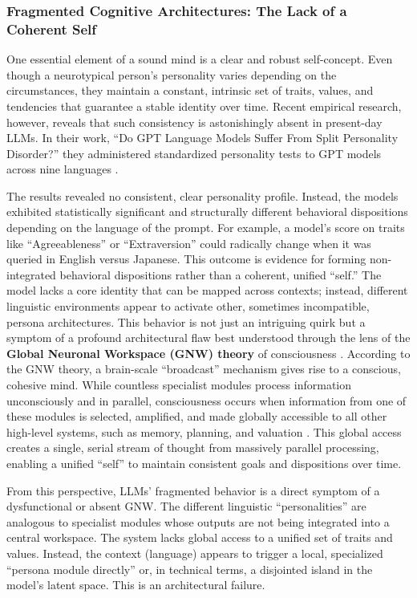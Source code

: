 \documentclass{article}
\begin{document}
\subsubsection{Fragmented Cognitive Architectures: The Lack of a Coherent Self}
One essential element of a sound mind is a clear and robust self-concept. Even though a neurotypical person's personality varies depending on the circumstances, they maintain a constant, intrinsic set of traits, values, and tendencies that guarantee a stable identity over time. Recent empirical research, however, reveals that such consistency is astonishingly absent in present-day LLMs. In their work, “Do GPT Language Models Suffer From Split Personality Disorder?” they administered standardized personality tests to GPT models across nine languages \citep{ref21}.

The results revealed no consistent, clear personality profile. Instead, the models exhibited statistically significant and structurally different behavioral dispositions depending on the language of the prompt. For example, a model's score on traits like “Agreeableness” or “Extraversion” could radically change when it was queried in English versus Japanese. This outcome is evidence for forming non-integrated behavioral dispositions rather than a coherent, unified “self.” The model lacks a core identity that can be mapped across contexts; instead, different linguistic environments appear to activate other, sometimes incompatible, persona architectures. This behavior is not just an intriguing quirk but a symptom of a profound architectural flaw best understood through the lens of the \textbf{Global Neuronal Workspace (GNW) theory} of consciousness \citep{ref12}. According to the GNW theory, a brain-scale “broadcast” mechanism gives rise to a conscious, cohesive mind. While countless specialist modules process information unconsciously and in parallel, consciousness occurs when information from one of these modules is selected, amplified, and made globally accessible to all other high-level systems, such as memory, planning, and valuation \citep{ref12}. This global access creates a single, serial stream of thought from massively parallel processing, enabling a unified “self” to maintain consistent goals and dispositions over time.

From this perspective, LLMs' fragmented behavior is a direct symptom of a dysfunctional or absent GNW. The different linguistic “personalities” are analogous to specialist modules whose outputs are not being integrated into a central workspace. The system lacks global access to a unified set of traits and values. Instead, the context (language) appears to trigger a local, specialized “persona module directly” or, in technical terms, a disjointed island in the model's latent space. This is an architectural failure.
\end{document}
